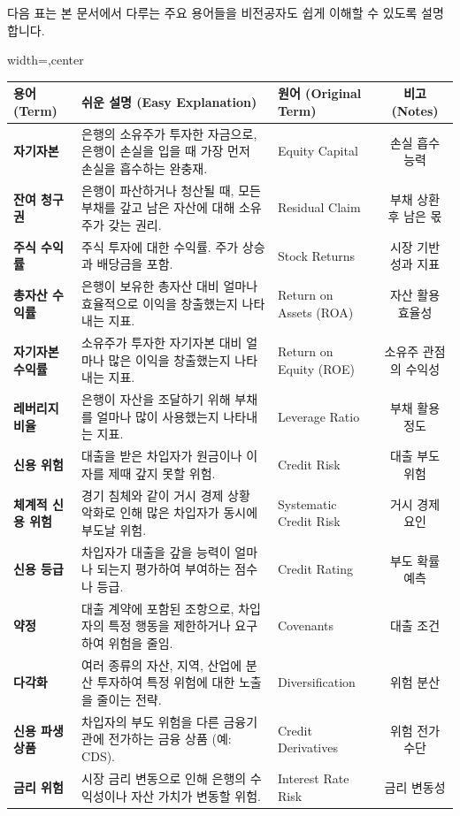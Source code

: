 \documentclass[11pt,a4paper]{article}
\begin{document}
다음 표는 본 문서에서 다루는 주요 용어들을 비전공자도 쉽게 이해할 수 있도록 설명합니다.

\begin{adjustbox}{width=\textwidth,center}
\begin{tabular}{lllc}
\toprule
\textbf{용어 (Term)} & \textbf{쉬운 설명 (Easy Explanation)} & \textbf{원어 (Original Term)} & \textbf{비고 (Notes)} \\
\midrule
\textbf{자기자본} & 은행의 소유주가 투자한 자금으로, 은행이 손실을 입을 때 가장 먼저 손실을 흡수하는 완충재. & Equity Capital & 손실 흡수 능력 \\
\textbf{잔여 청구권} & 은행이 파산하거나 청산될 때, 모든 부채를 갚고 남은 자산에 대해 소유주가 갖는 권리. & Residual Claim & 부채 상환 후 남은 몫 \\
\textbf{주식 수익률} & 주식 투자에 대한 수익률. 주가 상승과 배당금을 포함. & Stock Returns & 시장 기반 성과 지표 \\
\textbf{총자산 수익률} & 은행이 보유한 총자산 대비 얼마나 효율적으로 이익을 창출했는지 나타내는 지표. & Return on Assets (ROA) & 자산 활용 효율성 \\
\textbf{자기자본 수익률} & 소유주가 투자한 자기자본 대비 얼마나 많은 이익을 창출했는지 나타내는 지표. & Return on Equity (ROE) & 소유주 관점의 수익성 \\
\textbf{레버리지 비율} & 은행이 자산을 조달하기 위해 부채를 얼마나 많이 사용했는지 나타내는 지표. & Leverage Ratio & 부채 활용 정도 \\
\textbf{신용 위험} & 대출을 받은 차입자가 원금이나 이자를 제때 갚지 못할 위험. & Credit Risk & 대출 부도 위험 \\
\textbf{체계적 신용 위험} & 경기 침체와 같이 거시 경제 상황 악화로 인해 많은 차입자가 동시에 부도날 위험. & Systematic Credit Risk & 거시 경제 요인 \\
\textbf{신용 등급} & 차입자가 대출을 갚을 능력이 얼마나 되는지 평가하여 부여하는 점수나 등급. & Credit Rating & 부도 확률 예측 \\
\textbf{약정} & 대출 계약에 포함된 조항으로, 차입자의 특정 행동을 제한하거나 요구하여 위험을 줄임. & Covenants & 대출 조건 \\
\textbf{다각화} & 여러 종류의 자산, 지역, 산업에 분산 투자하여 특정 위험에 대한 노출을 줄이는 전략. & Diversification & 위험 분산 \\
\textbf{신용 파생상품} & 차입자의 부도 위험을 다른 금융기관에 전가하는 금융 상품 (예: CDS). & Credit Derivatives & 위험 전가 수단 \\
\textbf{금리 위험} & 시장 금리 변동으로 인해 은행의 수익성이나 자산 가치가 변동할 위험. & Interest Rate Risk & 금리 변동성 \\

\end{tabular}
\end{adjustbox}
\end{document}
